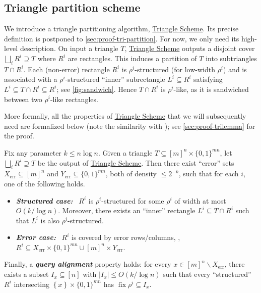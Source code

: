 \documentclass{toc}
\newcommand{\rectlemma}{\expref{Lemma}{lem:scheme}\xspace}%
\newcommand{\trischeme}{\hyperref[alg:tri-partition]{Triangle Scheme}\xspace}
\DeclareMathOperator{\fix}{fix}
\DeclareMathOperator{\err}{err}
\newcommand{\allX}{[m]^n}
\newcommand{\allY}{\{0,1\}^{mn}}
\newcommand{\set}[1]{\left \{ #1 \right \}}
\begin{document}
\subsection{Triangle partition scheme} \label{sec:trischeme-intro}

We introduce a triangle partitioning algorithm, \trischeme. Its precise definition is postponed to \autoref{sec:proof-tri-partition}. For now, we only need its high-level 
description. %
On input a triangle $T$, \trischeme outputs a disjoint cover $\bigsqcup_i R^i\supseteq T$ where $R^i$ are rectangles. This induces a partition of $T$ into subtriangles $T\cap R^i$. Each (non-error) rectangle $R^i$ is $\rho^i$-structured (for low-width $\rho^i$) and is associated with a $\rho^i$-structured ``inner'' subrectangle $L^i\subseteq R^i$ satisfying $L^i\subseteq T\cap R^i\subseteq R^i$; see \autoref{fig:sandwich}. Hence $T\cap R^i$ is $\rho^i$-like, as it is sandwiched between two $\rho^i$-like rectangles.

More formally, all the properties of \trischeme that we will subsequently need are formalized below (note the similarity with \rectlemma); see \autoref{sec:proof-trilemma} for the proof.

\begin{lemma}\label{lem:tri-scheme} %
  Fix any parameter $k \le n \log n$. Given a triangle $T\subseteq \allX\times\allY$, let $\bigsqcup_i R^i \supseteq T$ be the output of \trischeme. Then there exist ``error'' sets $X_{\err}\subseteq \allX$ and $Y_{\err}\subseteq\allY$, both of density $\leq 2^{-k}$, such that for each $i$, one of the following
holds. %
\begin{itemize}[label=$\bullet$,itemsep=1mm]
	\item {\bf\slshape Structured case:}~ $R^i$ is $\rho^i$-structured for some $\rho^i$ of width at most $O(k/\log n)$. Moreover, there exists an ``inner'' rectangle $L^i \subseteq T \cap R^i$ such that $L^i$ is also $\rho^i$-structured. 
	\item {\bf\slshape Error case:}~ $R^i$ is covered by error rows/columns, \ie, $R^i\subseteq X_{\err}\times \allY\cup \allX\times Y_{\err}$.
\end{itemize}
Finally, a {\bf\itshape query alignment} property holds: for every $x \in \allX\smallsetminus X_{\err}$, there exists a subset $I_x \subseteq [n]$ with $|I_x| \le O(k/\log n)$ such that every ``structured'' $R^i$ intersecting $\set{x} \times \allY$ has $\fix \rho^i \subseteq I_x$.
\end{lemma}
\end{document}
